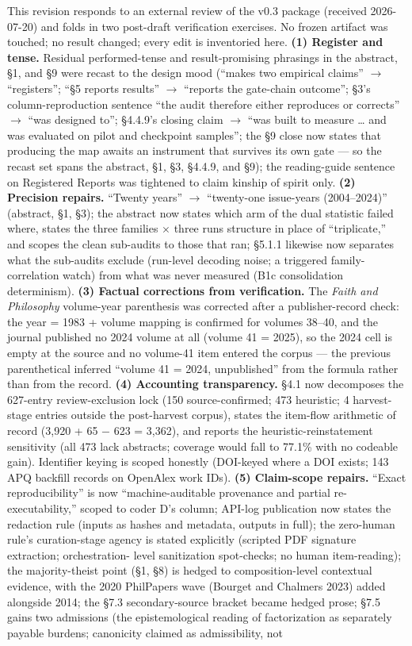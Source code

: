 This revision responds to an external review of the v0.3 package (received 2026-07-20) and folds in two post-draft verification exercises. No frozen artifact was touched; no result changed; every edit is inventoried here. \textbf{(1) Register and tense.} Residual performed-tense and result-promising phrasings in the abstract, \S{}1, and \S{}9 were recast to the design mood (``makes two empirical claims'' $\to$ ``registers''; ``\S{}5 reports results'' $\to$ ``reports the gate-chain outcome''; \S{}3's column-reproduction sentence ``the audit therefore either reproduces or corrects'' $\to$ ``was designed to''; \S{}4.4.9's closing claim $\to$ ``was built to measure \ldots{} and was evaluated on pilot and checkpoint samples''; the \S{}9 close now states that producing the map awaits an instrument that survives its own gate --- so the recast set spans the abstract, \S{}1, \S{}3, \S{}4.4.9, and \S{}9); the reading-guide sentence on Registered Reports was tightened to claim kinship of spirit only. \textbf{(2) Precision repairs.} ``Twenty years'' $\to$ ``twenty-one issue-years (2004--2024)'' (abstract, \S{}1, \S{}3); the abstract now states which arm of the dual statistic failed where, states the three families $\times$ three runs structure in place of ``triplicate,'' and scopes the clean sub-audits to those that ran; \S{}5.1.1 likewise now separates what the sub-audits exclude (run-level decoding noise; a triggered family-correlation watch) from what was never measured (B1c consolidation determinism). \textbf{(3) Factual corrections from verification.} The \emph{Faith and Philosophy} volume-year parenthesis was corrected after a publisher-record check: the year = 1983 + volume mapping is confirmed for volumes 38--40, and the journal published no 2024 volume at all (volume 41 = 2025), so the 2024 cell is empty at the source and no volume-41 item entered the corpus --- the previous parenthetical inferred ``volume 41 = 2024, unpublished'' from the formula rather than from the record. \textbf{(4) Accounting transparency.} \S{}4.1 now decomposes the 627-entry review-exclusion lock (150 source-confirmed; 473 heuristic; 4 harvest-stage entries outside the post-harvest corpus), states the item-flow arithmetic of record (3,920 + 65 $-$ 623 = 3,362), and reports the heuristic-reinstatement sensitivity (all 473 lack abstracts; coverage would fall to 77.1\% with no codeable gain). Identifier keying is scoped honestly (DOI-keyed where a DOI exists; 143 APQ backfill records on OpenAlex work IDs). \textbf{(5) Claim-scope repairs.} ``Exact reproducibility'' is now ``machine-auditable provenance and partial re-executability,'' scoped to coder D's column; API-log publication now states the redaction rule (inputs as hashes and metadata, outputs in full); the zero-human rule's curation-stage agency is stated explicitly (scripted PDF signature extraction; orchestration- level sanitization spot-checks; no human item-reading); the majority-theist point (\S{}1, \S{}8) is hedged to composition-level contextual evidence, with the 2020 PhilPapers wave (Bourget and Chalmers 2023) added alongside 2014; the \S{}7.3 secondary-source bracket became hedged prose; \S{}7.5 gains two admissions (the epistemological reading of factorization as separately payable burdens; canonicity claimed as admissibility, not 